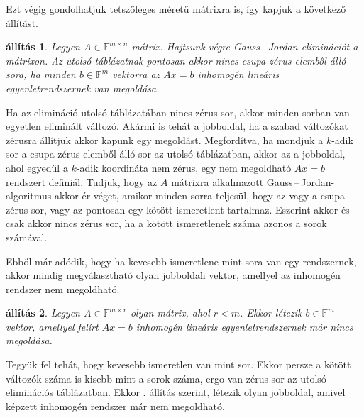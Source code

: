 \documentclass[a4paper, showtrims]{memoir}
\makeatletter
\renewenvironment{proof}[1][\proofname]
    {\par\pushQED{\qed}%
    \normalfont \topsep6\p@\@plus6\p@\relax
    \trivlist
    \item[\hskip\labelsep
        \itshape
    #1\@addpunct{:}]\ignorespaces}
    {\popQED\endtrivlist\@endpefalse}
\theoremstyle{plain}
\newtheorem{proposition}{állítás}[chapter]
\theoremstyle{remark}
\theoremstyle{definition}
\makeatother
\begin{document}
Ezt végig gondolhatjuk tetszőleges méretű mátrixra is, így kapjuk a következő állítást.
\begin{proposition}
    Legyen $A\in\mathbb{F}^{m\times n}$ mátrix.
    Hajtsunk végre Gauss\,--\,Jordan-eliminációt a mátrixon.
    Az utolsó táblázatnak pontosan akkor nincs csupa zérus elemből álló sora,
    ha minden $b\in\mathbb{F}^m$ vektorra az 
    $Ax=b$ inhomogén lineáris egyenletrendszernek van megoldása.
    \label{pr:nincsmo}
\end{proposition}
\begin{proof}
    Ha az elimináció utolsó táblázatában nincs zérus sor, akkor minden sorban van egyetlen eliminált változó. 
    Akármi is tehát a jobboldal, ha a szabad változókat zérusra állítjuk akkor kapunk egy megoldást.
    Megfordítva, ha mondjuk a $k$-adik sor a csupa zérus elemből álló sor az utolsó táblázatban, 
    akkor az a jobboldal, ahol egyedül a $k$-adik koordináta nem zérus,
    egy nem megoldható $Ax=b$ rendszert definiál.
\end{proof}
	Tudjuk, hogy az $A$ mátrixra alkalmazott Gauss\,--\,Jordan-algoritmus  akkor ér véget, amikor
	minden sorra teljesül, hogy az vagy a csupa zérus sor, vagy az pontosan egy kötött ismeretlent tartalmaz.
	Eszerint akkor és csak akkor nincs zérus sor, ha a kötött ismeretlenek száma azonos a sorok számával.

Ebből már adódik, hogy ha kevesebb ismeretlene mint sora van egy rendszernek, 
akkor mindig megválasztható olyan jobboldali vektor, 
amellyel az inhomogén rendszer nem megoldható.
\begin{proposition}
	Legyen $A\in\mathbb{F}^{m\times r}$ olyan mátrix, ahol $r<m$.
	Ekkor létezik $b\in\mathbb{F}^m$ vektor,
	amellyel felírt $Ax=b$ inhomogén lineáris egyenletrendszernek már nincs megoldása.
\end{proposition}
\begin{proof}
	Tegyük fel tehát, hogy kevesebb ismeretlen van mint sor.
    Ekkor persze a kötött változók száma is kisebb mint a sorok száma,
    ergo van zérus sor az utolsó eliminációs táblázatban.
    Ekkor . állítás szerint, létezik olyan jobboldal, amivel képzett inhomogén rendszer már nem megoldható.
\end{proof}
\end{document}
